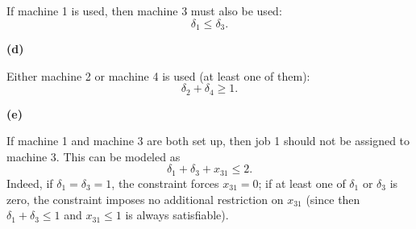 \documentclass{article}
\begin{document}
\begin{enumerate}
If machine 1 is used, then machine 3 must also be used:
\[
    \delta_1 \le \delta_3.
\]

\textbf{(d)}

Either machine 2 or machine 4 is used (at least one of them):
\[
    \delta_2 + \delta_4 \ge 1.
\]

\textbf{(e)}

If machine 1 and machine 3 are both set up, then job 1 should not be assigned to machine 3. This can be modeled as
\[
    \delta_1 + \delta_3 + x_{31} \le 2.
\]
Indeed, if $\delta_1 = \delta_3 = 1$, the constraint forces $x_{31} = 0$; if at least one of $\delta_1$ or $\delta_3$ is zero, the constraint imposes no additional restriction on $x_{31}$ (since then $\delta_1 + \delta_3 \le 1$ and $x_{31} \le 1$ is always satisfiable).

%
%        
%     
%
\end{enumerate}
\end{document}
